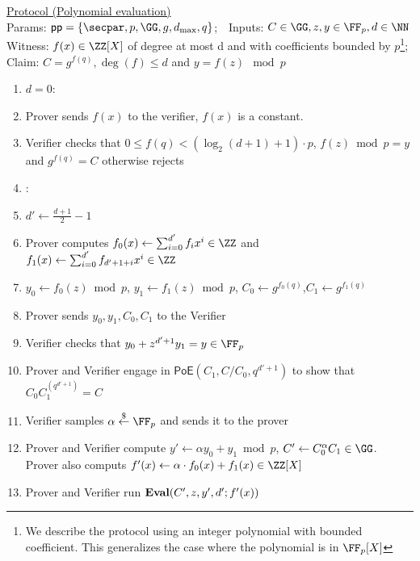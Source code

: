 \documentclass{article}
\begin{document}
\begin{small}
 \begin{minipage}{1.1\textwidth}
\begin{mdframed}[userdefinedwidth=1\textwidth]  \label{prot:Opening}
	\noindent \underline{\textsf{Protocol \eval} (Polynomial evaluation)}\\
\noindent Params: $\crs=\{\secpar,p,\GG,g,d_{\max},q\}$;\ \
Inputs: $C\in \GG,z,y\in \FF_p,d \in \NN $\\
Witness: $f(x) \in \ZZ[X]$ of degree at most d and with coefficients bounded by $p$\footnote{We describe the protocol using an integer polynomial with bounded coefficient. This generalizes the case where the polynomial is in $\FF_p[X]$};\\ 
Claim: $C=g^{f(q)},\deg(f)\leq d$ and $y=f(z) \mod p$

\begin{enumerate}[nolistsep]
\item \pcif $d=0$:
\item \pcind[1] Prover sends $f(x)$ to the verifier, $f(x)$ is a constant. 
\item \pcind[1] Verifier checks that $0\leq f(q)< (\log_2(d+1)+1)\cdot p$,  $f(z) \bmod p=y$ and $g^{f(q)}=C$ otherwise rejects
\item \pcelse: 
\item \pcind[1] $d'\gets \frac{d+1}{2}-1$
\item \pcind[1] Prover computes $f_0(x)\gets\sum_{i=0}^{d'} f_i x^i\in \ZZ$ and $f_1(x)\gets\sum_{i=0}^{d'} f_{d'+1+i} x^{i}\in \ZZ$
\item \pcind[1] $y_0\gets f_0(z) \bmod p$, $y_1\gets f_1(z)\bmod p$, $C_0\gets g^{f_0(q)}$,$C_1\gets g^{f_1(q)}$
\item \pcind[1] Prover sends $y_0,y_1,C_0,C_1$ to the Verifier
\item \pcind[1] Verifier checks that $y_0+z^{d'+1} y_1=y\in \FF_p$ 
\item \pcind[1] Prover and Verifier engage in $\textsf{PoE}(C_1,C/C_0,q^{d'+1})$ to show that $C_0C_1^{(q^{d'+1})}=C$
\item \pcind[1] Verifier samples $\alpha \sample \FF_p$ and sends it to the prover
\item \pcind[1] Prover and Verifier compute $y'\gets\alpha y_0 +y_1 \bmod p$, $C'\gets C_0^{\alpha}C_1 \in \GG$. \\Prover also computs $f'(x)\gets\alpha  \cdot f_0(x)+f_1(x) \in \ZZ[X]$ 
\item \pcind[1] Prover and Verifier run $\textbf{{Eval}}(C',z,y',d';f'(x))$
\end{enumerate}
\end{mdframed}
\end{minipage}
\end{small}
\end{document}
